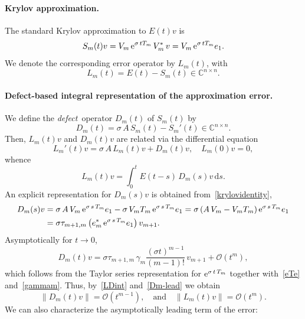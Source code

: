 \documentclass[smallextended]{svjour3pre}%
\numberwithin{equation}{section}
\numberwithin{figure}{section}
\numberwithin{table}{section}
\newcommand{\C}{\mathbb C}%
\newcommand\tjnew[1]{{#1}}
\newcommand{\dd}{\mathrm{d}}
\newcommand{\ee}{{\rm e}}
\newcommand\sca{\sigma}
\newcommand\Opgen{A}
\begin{document}
\paragraph{Krylov approximation.}
The standard Krylov approximation to $ E(t)v $ is
\begin{equation} \label{Smv}
S_m(t)v  = V_m\,\ee^{\sca\,t T_m}\,V_m^\ast\,v
         = V_m\,\ee^{\sca\,t T_m}e_1.
\end{equation}
We denote the corresponding error operator by $ L_m(t) $, with
\begin{equation} \label{Lerror}
L_m(t)=E(t)-S_m(t) \in \C^{n \times n}.
\end{equation}

\paragraph{Defect-based integral representation of the approximation error.}
We define the \emph{defect}\, operator $ D_m(t) $ of $ S_m(t) $ by
\begin{equation*}
D_m(t) = \sca\,\Opgen\,S_m(t) - S_m'(t) \in \C^{n \times n}.
\end{equation*}
Then, $ L_m(t)v $ and $ D_m(t)v $ are related via the differential equation
\begin{equation*}
L_m'(t)v = \sca\,\Opgen\,L_m(t)v + D_m(t)v, \quad L_m(0)v=0,
\end{equation*}
whence
\begin{equation} \label{LDint}
L_m(t)v = \int_0^t E(t-s)\,D_m(s)v\,\dd s.
\end{equation}
An explicit representation for $ D_m(s)v $
is obtained from~\eqref{krylovidentity},
\begin{align}
D_m(s)v
&= \sca\,\Opgen\,V_m\,\ee^{\sca\,s\,T_m}e_1 - \sca\,V_m T_m\,\ee^{\sca\,s\,T_m}e_1
 = \sca\,(\Opgen\,V_m - V_m T_m)\,\ee^{\sca\,s\,T_m}e_1 \notag \\
&= \sca \tau_{m+1,m}\,\big(e_m^\ast\,\ee^{\sca\,s\,T_m}e_1\big)\,v_{m+1}.
\label{Dm(s)v}
\end{align}
Asymptotically for $ t \to 0 $,
\begin{equation} \label{Dm-lead}
D_m(t)v = \sca \tau_{m+1,m}\,\gamma_m\frac{(\sigma t)^{m-1}}{(m-1)!}\,v_{m+1}
+ {\mathcal{O}}(t^m),
\end{equation}
which follows from the Taylor series representation
for $ \ee^{\sca\,t\,T_m} $ together with~\eqref{eTe} and~\eqref{gammam}.
\tjnew{Thus, by~\eqref{LDint} and~\eqref{Dm-lead} we obtain
\begin{equation}\label{orderofDmLm}
\| D_m(t)v \| = {\mathcal{O}}(t^{m-1}),
\quad \text{and} \quad
\| L_m(t)v \| = {\mathcal{O}}(t^{m}).
\end{equation}}
We can also characterize the asymptotically leading term of the error:
\end{document}

